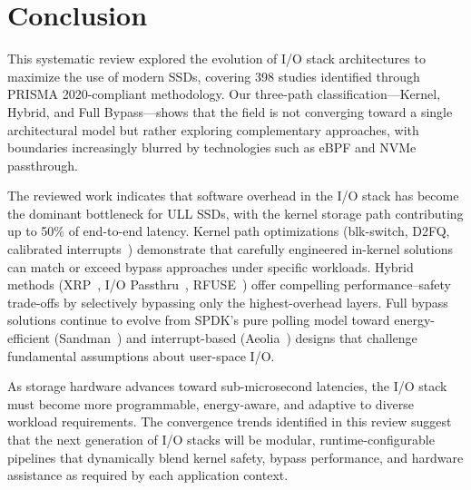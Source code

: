 \documentclass[conference]{IEEEtran}
\begin{document}
\section{Conclusion}
\label{sec:conclusion}

This systematic review explored the evolution of I/O stack architectures to maximize the use of modern SSDs, covering 398 studies identified through PRISMA 2020-compliant methodology. Our three-path classification---Kernel, Hybrid, and Full Bypass---shows that the field is not converging toward a single architectural model but rather exploring complementary approaches, with boundaries increasingly blurred by technologies such as eBPF and NVMe passthrough.

The reviewed work indicates that software overhead in the I/O stack has become the dominant bottleneck for ULL SSDs, with the kernel storage path contributing up to 50\% of end-to-end latency. Kernel path optimizations (blk-switch, D2FQ, calibrated interrupts~\cite{yang2022calibrated}) demonstrate that carefully engineered in-kernel solutions can match or exceed bypass approaches under specific workloads. Hybrid methods (XRP~\cite{zhong2022xrp}, I/O Passthru~\cite{joshi2024iopassthru}, RFUSE~\cite{rfuse2024}) offer compelling performance--safety trade-offs by selectively bypassing only the highest-overhead layers. Full bypass solutions continue to evolve from SPDK's pure polling model toward energy-efficient (Sandman~\cite{zhou2025sandman}) and interrupt-based (Aeolia~\cite{zhou2025aeolia}) designs that challenge fundamental assumptions about user-space I/O.

As storage hardware advances toward sub-microsecond latencies, the I/O stack must become more programmable, energy-aware, and adaptive to diverse workload requirements. The convergence trends identified in this review suggest that the next generation of I/O stacks will be modular, runtime-configurable pipelines that dynamically blend kernel safety, bypass performance, and hardware assistance as required by each application context.



\end{document}
